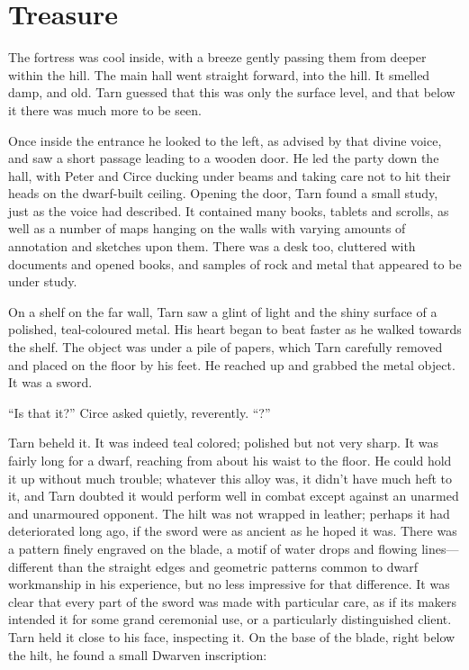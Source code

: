 \chapter{Treasure}

The fortress was cool inside, with a breeze gently passing them from deeper within the hill.  The main hall went straight forward, into the hill.  It smelled damp, and old.  Tarn guessed that this was only the surface level, and that below it there was much more to be seen.

Once inside the entrance he looked to the left, as advised by that divine voice, and saw a short passage leading to a wooden door.  He led the party down the hall, with Peter and Circe ducking under beams and taking care not to hit their heads on the dwarf-built ceiling.  Opening the door, Tarn found a small study, just as the voice had described.  It contained many books, tablets and scrolls, as well as a number of maps hanging on the walls with varying amounts of annotation and sketches upon them.  There was a desk too, cluttered with documents and opened books, and samples of rock and metal that appeared to be under study.

On a shelf on the far wall, Tarn saw a glint of light and the shiny surface of a polished, teal-coloured metal.  His heart began to beat faster as he walked towards the shelf.  The object was under a pile of papers, which Tarn carefully removed and placed on the floor by his feet.  He reached up and grabbed the metal object.  It was a sword.

``Is that it?'' Circe asked quietly, reverently.  ``\kildir?''

Tarn beheld it.  It was indeed teal colored; polished but not very sharp.  It was fairly long for a dwarf, reaching from about his waist to the floor.  He could hold it up without much trouble; whatever this alloy was, it didn't have much heft to it, and Tarn doubted it would perform well in combat except against an unarmed and unarmoured opponent.  The hilt was not wrapped in leather; perhaps it had deteriorated long ago, if the sword were as ancient as he hoped it was.  There was a pattern finely engraved on the blade, a motif of water drops and flowing lines---different than the straight edges and geometric patterns common to dwarf workmanship in his experience, but no less impressive for that difference.  It was clear that every part of the sword was made with particular care, as if its makers intended it for some grand ceremonial use, or a particularly distinguished client.  Tarn held it close to his face, inspecting it.  On the base of the blade, right below the hilt, he found a small Dwarven inscription:

